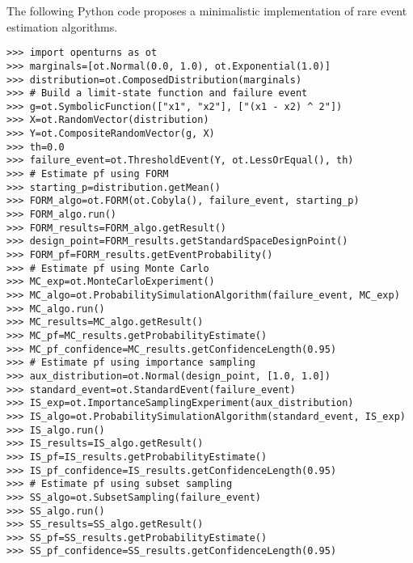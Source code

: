\begin{otexample}
    The following Python code proposes a minimalistic \ot implementation of rare event estimation algorithms. 
    \lstset{style=mystyle, language=python}
%
\begin{lstlisting}
>>> import openturns as ot
>>> marginals=[ot.Normal(0.0, 1.0), ot.Exponential(1.0)]
>>> distribution=ot.ComposedDistribution(marginals)
>>> # Build a limit-state function and failure event
>>> g=ot.SymbolicFunction(["x1", "x2"], ["(x1 - x2) ^ 2"])
>>> X=ot.RandomVector(distribution)
>>> Y=ot.CompositeRandomVector(g, X)
>>> th=0.0
>>> failure_event=ot.ThresholdEvent(Y, ot.LessOrEqual(), th)
>>> # Estimate pf using FORM
>>> starting_p=distribution.getMean()
>>> FORM_algo=ot.FORM(ot.Cobyla(), failure_event, starting_p)
>>> FORM_algo.run()
>>> FORM_results=FORM_algo.getResult()
>>> design_point=FORM_results.getStandardSpaceDesignPoint()
>>> FORM_pf=FORM_results.getEventProbability()
>>> # Estimate pf using Monte Carlo 
>>> MC_exp=ot.MonteCarloExperiment()
>>> MC_algo=ot.ProbabilitySimulationAlgorithm(failure_event, MC_exp)
>>> MC_algo.run()
>>> MC_results=MC_algo.getResult()
>>> MC_pf=MC_results.getProbabilityEstimate()
>>> MC_pf_confidence=MC_results.getConfidenceLength(0.95)
>>> # Estimate pf using importance sampling
>>> aux_distribution=ot.Normal(design_point, [1.0, 1.0])
>>> standard_event=ot.StandardEvent(failure_event)
>>> IS_exp=ot.ImportanceSamplingExperiment(aux_distribution)
>>> IS_algo=ot.ProbabilitySimulationAlgorithm(standard_event, IS_exp)
>>> IS_algo.run()
>>> IS_results=IS_algo.getResult()
>>> IS_pf=IS_results.getProbabilityEstimate()
>>> IS_pf_confidence=IS_results.getConfidenceLength(0.95)
>>> # Estimate pf using subset sampling
>>> SS_algo=ot.SubsetSampling(failure_event)
>>> SS_algo.run()
>>> SS_results=SS_algo.getResult()
>>> SS_pf=SS_results.getProbabilityEstimate()
>>> SS_pf_confidence=SS_results.getConfidenceLength(0.95)
\end{lstlisting}
%
\end{otexample}


